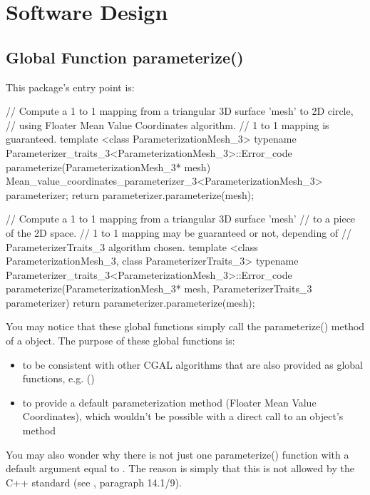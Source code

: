 \section{Software Design}

\subsection{Global Function parameterize()}

This package's entry point is:

\begin{ccExampleCode}

// Compute a 1 to 1 mapping from a triangular 3D surface 'mesh' to 2D circle,
// using Floater Mean Value Coordinates algorithm.
// 1 to 1 mapping is guaranteed.
template <class ParameterizationMesh_3>
typename Parameterizer_traits_3<ParameterizationMesh_3>::Error_code
parameterize(ParameterizationMesh_3* mesh)
{
    Mean_value_coordinates_parameterizer_3<ParameterizationMesh_3> parameterizer;
    return parameterizer.parameterize(mesh);
}

// Compute a 1 to 1 mapping from a triangular 3D surface 'mesh'
// to a piece of the 2D space.
// 1 to 1 mapping may be guaranteed or not, depending of
// ParameterizerTraits_3 algorithm chosen.
template <class ParameterizationMesh_3, class ParameterizerTraits_3>
typename Parameterizer_traits_3<ParameterizationMesh_3>::Error_code
parameterize(ParameterizationMesh_3* mesh,
             ParameterizerTraits_3 parameterizer)
{
    return parameterizer.parameterize(mesh);
}

\end{ccExampleCode}

You may notice that these global functions simply call the
parameterize() method of a  object.
The purpose of these global functions is:
\begin{itemize}
\item to be consistent with other CGAL algorithms that are also provided as
      global functions, e.g. ()
\item to provide a default parameterization method (Floater Mean Value Coordinates),
      which wouldn't be possible with a direct call to an object's method
\end{itemize}

You may also wonder why there is not just one parameterize() function with a
default  argument equal to
.
The reason is simply that this is not allowed by the C++ standard (see
\cite{cgal:ansi-is14882-98}, paragraph 14.1/9).


